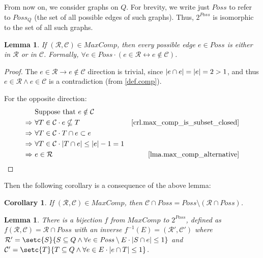 \documentclass{report}
\DeclarePairedDelimiter{\abs}{\lvert}{\rvert}
\newtheorem{lemma}[theorem]{Lemma}
\newtheorem{corollary}[theorem]{Corollary}
\theoremstyle{definition}
\begin{document}
From now on, we consider graphs on $Q$. For brevity, we write just $\mathit{Poss}$ to refer
to $\mathit{Poss}_Q$ (the set of all possible edges of such graphs). Thus, $2^{\mathit{Poss}}$ is
isomorphic to the set of all such graphs.

\begin{lemma} \label{lma.max_comp_has_edges}
If $(\mathcal{R}, \mathcal{C}) \in \mathit{MaxComp}$, then every possible edge $e \in \mathit{Poss}$
is either in $\mathcal{R}$ or in $\mathcal{C}$. Formally,
$\forall e \in \mathit{Poss} \cdot (e \in \mathcal{R} \leftrightarrow e \notin \mathcal{C})$.
\end{lemma}

\begin{proof}
The $e \in \mathcal{R} \rightarrow e \notin \mathcal{C}$ direction is trivial,
since $\abs{e \cap e} = \abs{e} = 2 > 1$, and thus
$e \in \mathcal{R} \wedge e \in \mathcal{C}$ is a contradiction
(from \cref{def.comp}).

For the opposite direction:
\begin{align*}
& \text{Suppose that } e \notin \mathcal{C} \\
\Rightarrow \ & \forall T \in \mathcal{C} \cdot e \nsubseteq T
& \text{\cref{crl.max_comp_is_subset_closed}} \\
\Rightarrow \ & \forall T \in \mathcal{C} \cdot T \cap e \subset e \\
\Rightarrow \ & \forall T \in \mathcal{C} \cdot \abs{T \cap e} \leq \abs{e} - 1 = 1 \\
\Rightarrow \ & e \in \mathcal{R}
& \text{\cref{lma.max_comp_alternative}}
\end{align*}
\end{proof}

Then the following corollary is a consequence of the above lemma:

\begin{corollary} \label{crl.max_comp_C_edges}
If $(\mathcal{R}, \mathcal{C}) \in \mathit{MaxComp}$, then
$\mathcal{C} \cap \mathit{Poss} = \mathit{Poss} \setminus (\mathcal{R} \cap \mathit{Poss})$.
\end{corollary}

\begin{lemma} \label{lma.max_comp_graph_bijection}
There is a bijection $f$ from $\mathit{MaxComp}$ to $2^{\mathit{Poss}}$, defined as
$f(\mathcal{R}, \mathcal{C}) = \mathcal{R} \cap \mathit{Poss}$ with an inverse
$f^{-1}(E) = (\mathcal{R}', \mathcal{C}')$ where
$\mathcal{R}' = \setc{S}{S \subseteq Q \wedge \forall e \in \mathit{Poss} \setminus E \cdot
\abs{S \cap e} \leq 1}$
and
$\mathcal{C}' = \setc{T}{T \subseteq Q \wedge \forall e \in E \cdot
\abs{e \cap T} \leq 1}$.
\end{lemma}
\end{document}
